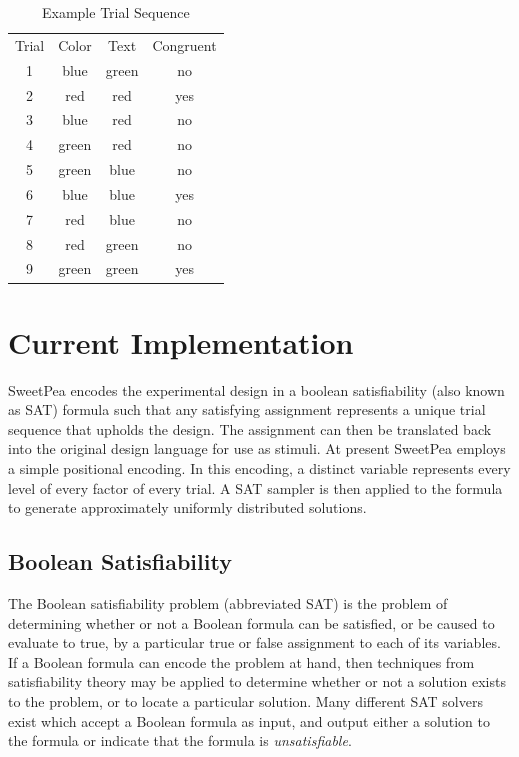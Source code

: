 \begin{table}[b]
  \centering
  \caption{Example Trial Sequence}
\begin{tabular}{cccc}
Trial & Color & Text  & Congruent \\
1     & blue  & green & no        \\
2     & red   & red   & yes       \\
3     & blue  & red   & no        \\
4     & green & red   & no        \\
5     & green & blue  & no        \\
6     & blue  & blue  & yes       \\
7     & red   & blue  & no        \\
8     & red   & green & no        \\
9     & green & green & yes
\end{tabular}
\label{tab:example_sequence}
\end{table}


\section{Current Implementation}

SweetPea encodes the experimental design in a boolean satisfiability (also known as SAT) formula such that any satisfying assignment represents a unique trial sequence that upholds the design. The assignment can then be translated back into the original design language for use as stimuli. At present SweetPea employs a simple positional encoding. In this encoding, a distinct variable represents every level of every factor of every trial. A SAT sampler is then applied to the formula to generate approximately uniformly distributed solutions.

\subsection{Boolean Satisfiability}

The Boolean satisfiability problem (abbreviated SAT) is the problem of determining whether or not a Boolean formula can be satisfied, or be caused to evaluate to true, by a particular true or false assignment to each of its variables. If a Boolean formula can encode the problem at hand, then techniques from satisfiability theory may be applied to determine whether or not a solution exists to the problem, or to locate a particular solution. Many different SAT solvers exist which accept a Boolean formula as input, and output either a solution to the formula or indicate that the formula is \textit{unsatisfiable}.

